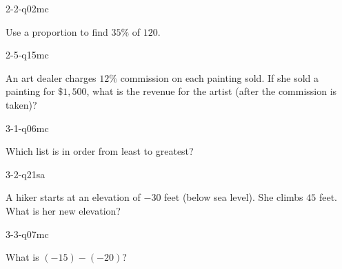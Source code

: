 \documentclass[12pt, fleqn, openany]{studyGuide}
\begin{document}
\begin{practiceQuestion}{2-2-q02}{mc}
\begin{questionText}
Use a proportion to find $35\%$ of $120$.
\end{questionText}
\end{practiceQuestion}

\begin{practiceQuestion}{2-5-q15}{mc}
\begin{questionText}
An art dealer charges $12\%$ commission on each painting sold. If she sold a painting for $\$1{,}500$, what is the revenue for the artist (after the commission is taken)?
\end{questionText}
\end{practiceQuestion}

\begin{practiceQuestion}{3-1-q06}{mc}
\begin{questionText}
Which list is in order from least to greatest?
\end{questionText}
\end{practiceQuestion}

\begin{practiceQuestion}{3-2-q21}{sa}
\begin{questionText}
A hiker starts at an elevation of $-30$ feet (below sea level). She climbs $45$ feet. What is her new elevation?
\end{questionText}
\end{practiceQuestion}

\begin{practiceQuestion}{3-3-q07}{mc}
\begin{questionText}
What is $(-15) - (-20)$?
\end{questionText}
\end{practiceQuestion}
\end{document}
